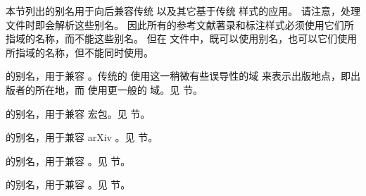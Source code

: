 本节列出的别名用于向后兼容传统 \BibTeX 以及其它基于传统 \BibTeX 样式的应用。
请注意，处理  文件时即会解析这些别名。
因此所有的参考文献著录和标注样式必须使用它们所指域的名称，而不能这些别名。
但在  文件中，既可以使用别名，也可以它们使用所指域的名称，但不能同时使用。


\begin{fieldlist}


 的别名，用于兼容 \BibTeX 。传统的 \BibTeX 使用这一稍微有些误导性的域  来表示出版地点，即出版者的所在地，而 \biblatex 使用更一般的  域。见  节。


 的别名，用于兼容  宏包。见  节。


 的别名，用于兼容 arXiv 。见  节。




 的别名，用于兼容 \BibTeX 。见  节。


 的别名，用于兼容 \BibTeX 。见  节。




\end{fieldlist}
